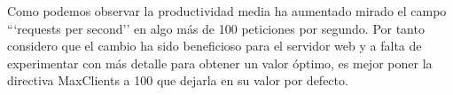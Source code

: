 Como podemos observar la productividad media ha aumentado mirado el campo ```requests per second'' en algo más de 100 peticiones por segundo. Por tanto considero que el cambio ha sido beneficioso para el servidor web y a falta de experimentar con más detalle para obtener un valor óptimo, es mejor poner la directiva MaxClients a 100 que dejarla en su valor por defecto.

